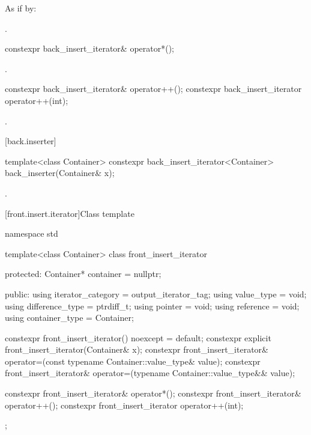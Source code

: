\begin{itemdescr}
\pnum
\effects
As if by: 

\pnum
\returns
{}.
\end{itemdescr}

%
\begin{itemdecl}
constexpr back_insert_iterator& operator*();
\end{itemdecl}

\begin{itemdescr}
\pnum
\returns
{}.
\end{itemdescr}

%
\begin{itemdecl}
constexpr back_insert_iterator& operator++();
constexpr back_insert_iterator  operator++(int);
\end{itemdecl}

\begin{itemdescr}
\pnum
\returns
{}.
\end{itemdescr}

[back.inserter]{ }

%
\begin{itemdecl}
template<class Container>
  constexpr back_insert_iterator<Container> back_inserter(Container& x);
\end{itemdecl}

\begin{itemdescr}
\pnum
\returns
{}.
\end{itemdescr}

[front.insert.iterator]{Class template }

%
\begin{codeblock}
namespace std {
  template<class Container>
  class front_insert_iterator {
  protected:
    Container* container = nullptr;

  public:
    using iterator_category = output_iterator_tag;
    using value_type        = void;
    using difference_type   = ptrdiff_t;
    using pointer           = void;
    using reference         = void;
    using container_type    = Container;

    constexpr front_insert_iterator() noexcept = default;
    constexpr explicit front_insert_iterator(Container& x);
    constexpr front_insert_iterator& operator=(const typename Container::value_type& value);
    constexpr front_insert_iterator& operator=(typename Container::value_type&& value);

    constexpr front_insert_iterator& operator*();
    constexpr front_insert_iterator& operator++();
    constexpr front_insert_iterator  operator++(int);
  };
}
\end{codeblock}

